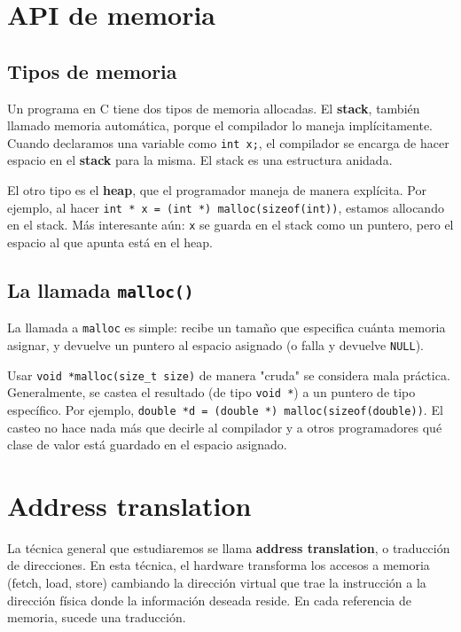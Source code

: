 \documentclass[12pt]{article}
\theoremstyle{definition}
\begin{document}
\section{API de memoria}

\subsection{Tipos de memoria}

Un programa en C tiene dos tipos de memoria allocadas. El \textbf{stack},
también llamado memoria automática, porque el compilador lo maneja
implícitamente. Cuando declaramos una variable como \texttt{int x;}, el
compilador se encarga de hacer espacio en el \textbf{stack} para la misma.
El stack es una estructura anidada.

El otro tipo es el \textbf{heap}, que el programador maneja de manera explícita.
Por ejemplo, al hacer \texttt{int * x = (int *) malloc(sizeof(int))}, estamos
allocando en el stack. Más interesante aún: \texttt{x} se guarda en el stack
como un puntero, pero el espacio al que apunta está en el heap.


\subsection{La llamada \texttt{malloc()}}

La llamada a \texttt{malloc} es simple: recibe un tamaño que especifica cuánta
memoria asignar, y devuelve un puntero al espacio asignado (o falla y devuelve
\texttt{NULL}).

Usar \texttt{void *malloc(size\_t size)} de manera "cruda" se considera mala
práctica. Generalmente, se castea el resultado (de tipo \texttt{void *}) a un
puntero de tipo específico. Por ejemplo, \texttt{double *d = (double *)
malloc(sizeof(double))}. El casteo no hace nada más que decirle al compilador y
a otros programadores qué clase de valor está guardado en el espacio asignado.


\section{Address translation}

La técnica general que estudiaremos se llama \textbf{address translation}, o
traducción de direcciones. En esta técnica, el hardware transforma los accesos a
memoria (fetch, load, store) cambiando la dirección virtual que trae la
instrucción a la dirección física donde la información deseada reside. En cada
referencia de memoria, sucede una traducción. 
\end{document}
